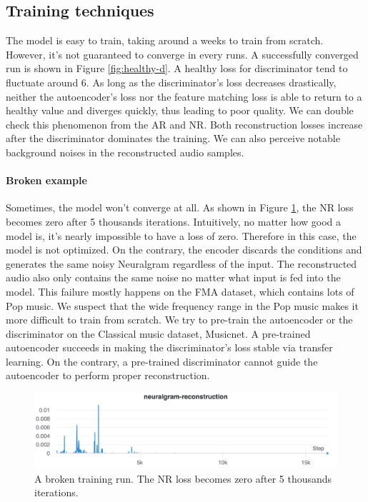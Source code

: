 \documentclass[12pt]{article}
\begin{document}
\subsection{Training techniques}
The model is easy to train, taking around a weeks to train from scratch. However, it's not guaranteed to converge in every runs. A successfully converged run is shown in Figure \ref{fig:healthy-d}. A healthy loss for discriminator tend to fluctuate around 6. As long as the discriminator's loss decreases drastically, neither the autoencoder's loss nor the feature matching loss is able to return to a healthy value and diverges quickly, thus leading to poor quality. We can double check this phenomenon from the AR and NR. Both reconstruction losses increase after the discriminator dominates the training. We can also perceive notable background noises in the reconstructed audio samples.

\paragraph{Broken example} Sometimes, the model won't converge at all. As shown in Figure \ref{fig:broken-nr}, the NR loss becomes zero after 5 thousands iterations. Intuitively, no matter how good a model is, it's nearly impossible to have a loss of zero. Therefore in this case, the model is not optimized. On the contrary, the encoder discards the conditions and generates the same noisy Neuralgram regardless of the input. The reconstructed audio also only contains the same noise no matter what input is fed into the model. This failure mostly happens on the FMA dataset, which contains lots of Pop music. We suspect that the wide frequency range in the Pop music makes it more difficult to train from scratch. We try to pre-train the autoencoder or the discriminator on the Classical music dataset, Musicnet. A pre-trained autoencoder succeeds in making the discriminator's loss stable via transfer learning. On the contrary, a pre-trained discriminator cannot guide the autoencoder to perform proper reconstruction.

\begin{figure}
\begin{center}
  \includegraphics[width=\textwidth]{assets/figures/broken-nr}
\end{center}
\caption{A broken training run. The NR loss becomes zero after 5 thousands iterations.}
\label{fig:broken-nr}
\end{figure}
\end{document}
